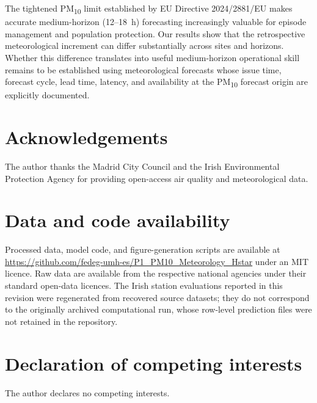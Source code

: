 \documentclass[12pt,a4paper]{article}
\newcommand{\PMten}{PM\textsubscript{10}}
\begin{document}
The tightened \PMten{} limit established by EU Directive 2024/2881/EU makes
accurate medium-horizon (12--18~h) forecasting increasingly valuable for
episode management and population protection.  Our results show that the
retrospective meteorological increment can differ substantially across sites and
horizons.  Whether this difference translates into useful medium-horizon
operational skill remains to be established using meteorological forecasts whose
issue time, forecast cycle, lead time, latency, and availability at the \PMten{}
forecast origin are explicitly documented.

\section*{Acknowledgements}

The author thanks the Madrid City Council and the Irish Environmental Protection
Agency for providing open-access air quality and meteorological data.

\section*{Data and code availability}

Processed data, model code, and figure-generation scripts are available at
\url{https://github.com/fedeg-umh-es/P1_PM10_Meteorology_Hstar} under an MIT licence.
Raw data are available from the respective national agencies under their
standard open-data licences. The Irish station evaluations reported in this revision were regenerated from recovered source datasets; they do not correspond to the originally archived computational run, whose row-level prediction files were not retained in the repository.

\section*{Declaration of competing interests}

The author declares no competing interests.
\end{document}
